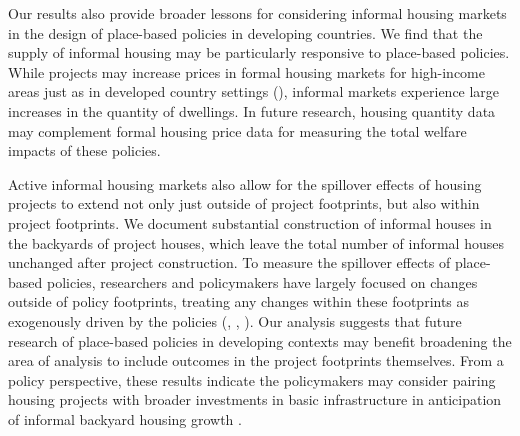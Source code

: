 \documentclass[12pt]{article}
\begin{document}

Our results also provide broader lessons for considering informal housing markets in the design of place-based policies in developing countries.  We find that the supply of informal housing may be particularly responsive to place-based policies.  While projects may increase prices in formal housing markets for high-income areas just as in developed country settings (\cite{diamond2016wants}), informal markets experience large increases in the quantity of dwellings.  In future research, housing quantity data may complement formal housing price data for measuring the total welfare impacts of these policies.  

Active informal housing markets also allow for the spillover effects of housing projects to extend not only just outside of project footprints, but also within project footprints.  We document substantial construction of informal houses in the backyards of project houses, which leave the total number of informal houses unchanged after project construction.  To measure the spillover effects of place-based policies, researchers and policymakers have largely focused on changes outside of policy footprints, treating any changes within these footprints as exogenously driven by the policies (\cite{diamond2016wants}, \cite{rossi2010housing}, \cite{hornbeck2017creative}).  Our analysis suggests that future research of place-based policies in developing contexts may benefit broadening the area of analysis to include outcomes in the project footprints themselves.  From a policy perspective, these results indicate the policymakers may consider pairing housing projects with broader investments in basic infrastructure in anticipation of informal backyard housing growth \citep{visagie2020getting}.
\end{document}
